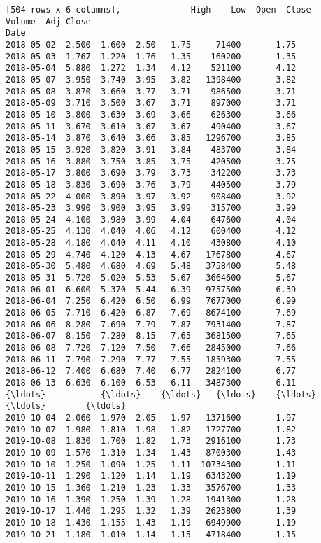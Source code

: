 \documentclass[11pt]{article}
\begin{document}
\begin{Verbatim}[commandchars=\\\{\}]
[504 rows x 6 columns],              High    Low  Open  Close    Volume  Adj Close
Date                                                      
2018-05-02  2.500  1.600  2.50   1.75     71400       1.75
2018-05-03  1.767  1.220  1.76   1.35    160200       1.35
2018-05-04  5.880  1.272  1.34   4.12    521100       4.12
2018-05-07  3.950  3.740  3.95   3.82   1398400       3.82
2018-05-08  3.870  3.660  3.77   3.71    986500       3.71
2018-05-09  3.710  3.500  3.67   3.71    897000       3.71
2018-05-10  3.800  3.630  3.69   3.66    626300       3.66
2018-05-11  3.670  3.610  3.67   3.67    490400       3.67
2018-05-14  3.870  3.640  3.66   3.85   1296700       3.85
2018-05-15  3.920  3.820  3.91   3.84    483700       3.84
2018-05-16  3.880  3.750  3.85   3.75    420500       3.75
2018-05-17  3.800  3.690  3.79   3.73    342200       3.73
2018-05-18  3.830  3.690  3.76   3.79    440500       3.79
2018-05-22  4.000  3.890  3.97   3.92    908400       3.92
2018-05-23  3.990  3.900  3.95   3.99    315700       3.99
2018-05-24  4.100  3.980  3.99   4.04    647600       4.04
2018-05-25  4.130  4.040  4.06   4.12    600400       4.12
2018-05-28  4.180  4.040  4.11   4.10    430800       4.10
2018-05-29  4.740  4.120  4.13   4.67   1767800       4.67
2018-05-30  5.480  4.680  4.69   5.48   3758400       5.48
2018-05-31  5.720  5.020  5.53   5.67   3664600       5.67
2018-06-01  6.600  5.370  5.44   6.39   9757500       6.39
2018-06-04  7.250  6.420  6.50   6.99   7677000       6.99
2018-06-05  7.710  6.420  6.87   7.69   8674100       7.69
2018-06-06  8.280  7.690  7.79   7.87   7931400       7.87
2018-06-07  8.150  7.280  8.15   7.65   3681500       7.65
2018-06-08  7.720  7.120  7.50   7.66   2845000       7.66
2018-06-11  7.790  7.290  7.77   7.55   1859300       7.55
2018-06-12  7.400  6.680  7.40   6.77   2824100       6.77
2018-06-13  6.630  6.100  6.53   6.11   3487300       6.11
{\ldots}           {\ldots}    {\ldots}   {\ldots}    {\ldots}       {\ldots}        {\ldots}
2019-10-04  2.060  1.970  2.05   1.97   1371600       1.97
2019-10-07  1.980  1.810  1.98   1.82   1727700       1.82
2019-10-08  1.830  1.700  1.82   1.73   2916100       1.73
2019-10-09  1.570  1.310  1.34   1.43   8700300       1.43
2019-10-10  1.250  1.090  1.25   1.11  10734300       1.11
2019-10-11  1.290  1.120  1.14   1.19   6343200       1.19
2019-10-15  1.360  1.210  1.23   1.33   3576700       1.33
2019-10-16  1.390  1.250  1.39   1.28   1941300       1.28
2019-10-17  1.440  1.295  1.32   1.39   2623800       1.39
2019-10-18  1.430  1.155  1.43   1.19   6949900       1.19
2019-10-21  1.180  1.010  1.14   1.15   4718400       1.15

\end{Verbatim}
\end{document}
